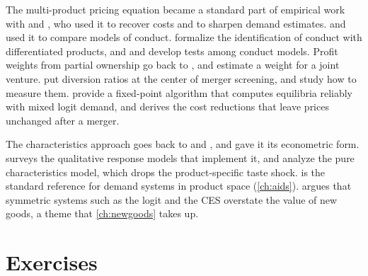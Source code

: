 The multi-product pricing equation became a standard part of empirical work with \citet{Berry1994} and
\citet{BerryLevinsohnPakes1995}, who used it to recover costs and to sharpen demand estimates. \citet{Bresnahan1987}
and \citet{Nevo2001} used it to compare models of conduct. \citet{BerryHaile2014} formalize the identification of
conduct with differentiated products, and \citet{BackusConlonSinkinson2021} and \citet{DuarteEtAl2024} develop tests
among conduct models. Profit weights from partial ownership go back to \citet{OBrienSalop2000}, and
\citet{MillerWeinberg2017} estimate a weight for a joint venture. \citet{FarrellShapiro2010} put diversion ratios at
the center of merger screening, and \citet{ConlonMortimer2021} study how to measure them. \citet{MorrowSkerlos2011}
provide a fixed-point algorithm that computes equilibria reliably with mixed logit demand, and \citet{Werden1996}
derives the cost reductions that leave prices unchanged after a merger.

The characteristics approach goes back to \citet{Lancaster1966} and \citet{Gorman1980}, and \citet{McFadden1974}
gave it its econometric form. \citet{McFadden1984} surveys the qualitative response models that implement it, and
\citet{BerryPakes2007} analyze the pure characteristics model, which drops the product-specific taste shock.
\citet{DeatonMuellbauer1980a} is the standard reference for demand systems in product space (\cref{ch:aids}).
\citet{Hausman1997} argues that symmetric systems such as the logit and the CES overstate the value of new goods, a
theme that \cref{ch:newgoods} takes up.

\section{Exercises}\label{sec:04-exercises}

